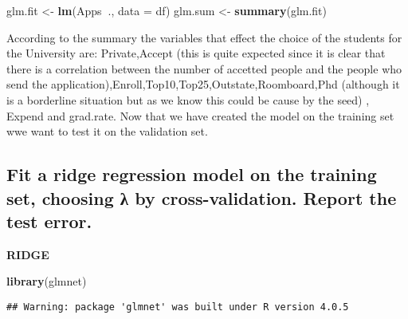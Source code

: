 \documentclass[
]{article}
\newenvironment{Shaded}{\begin{snugshade}}{\end{snugshade}}
\newcommand{\DataTypeTok}[1]{\textcolor[rgb]{0.13,0.29,0.53}{#1}}
\newcommand{\DecValTok}[1]{\textcolor[rgb]{0.00,0.00,0.81}{#1}}
\newcommand{\KeywordTok}[1]{\textcolor[rgb]{0.13,0.29,0.53}{\textbf{#1}}}
\newcommand{\NormalTok}[1]{#1}
\newcommand{\OperatorTok}[1]{\textcolor[rgb]{0.81,0.36,0.00}{\textbf{#1}}}
\newcommand{\StringTok}[1]{\textcolor[rgb]{0.31,0.60,0.02}{#1}}
\begin{document}
\begin{Shaded}
\begin{Highlighting}[]
\NormalTok{glm.fit <-}\StringTok{  }\KeywordTok{lm}\NormalTok{(Apps}\OperatorTok{~}\NormalTok{., }\DataTypeTok{data =}\NormalTok{ df)}
\NormalTok{glm.sum <-}\StringTok{ }\KeywordTok{summary}\NormalTok{(glm.fit)}
\end{Highlighting}
\end{Shaded}

According to the summary the variables that effect the choice of the
students for the University are: Private,Accept (this is quite expected
since it is clear that there is a correlation between the number of
accetted people and the people who send the
application),Enroll,Top10,Top25,Outstate,Roomboard,Phd (although it is a
borderline situation but as we know this could be cause by the seed) ,
Expend and grad.rate. Now that we have created the model on the training
set wwe want to test it on the validation set.

\begin{Shaded}
\end{Shaded}

\hypertarget{fit-a-ridge-regression-model-on-the-training-set-choosing-ux3bb-by-cross-validation.-report-the-test-error.}{%
\subsection{Fit a ridge regression model on the training set, choosing λ
by cross-validation. Report the test
error.}\label{fit-a-ridge-regression-model-on-the-training-set-choosing-ux3bb-by-cross-validation.-report-the-test-error.}}

\textbf{RIDGE}

\begin{Shaded}
\begin{Highlighting}[]
\KeywordTok{library}\NormalTok{(glmnet)}
\end{Highlighting}
\end{Shaded}

\begin{verbatim}
## Warning: package 'glmnet' was built under R version 4.0.5
\end{verbatim}
\end{document}
